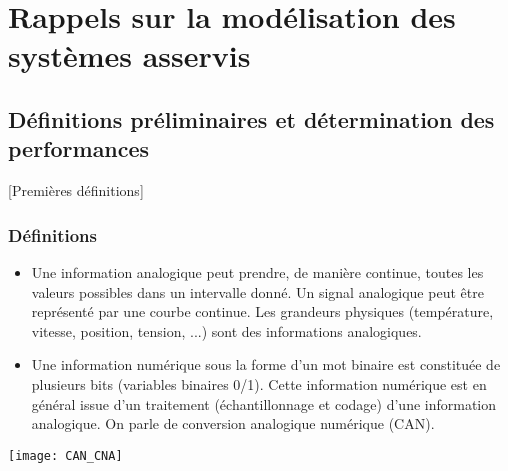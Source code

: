 \setchapterpreamble[u]{\margintoc}

\chapter{Rappels sur la modélisation des systèmes asservis}



\section{Définitions préliminaires et détermination des performances}[Premières définitions]

\subsection{Définitions}


\begin{defi} 

\begin{itemize}%
\item Une information analogique peut prendre, de manière continue, toutes les valeurs
possibles dans un intervalle donné. Un signal analogique peut être représenté
par une courbe continue. Les grandeurs physiques (température, vitesse,
position, tension, ...) sont des informations analogiques.

\item Une information numérique sous la forme d'un mot binaire est constituée de
plusieurs bits (variables binaires 0/1). Cette information numérique est en
général issue d'un traitement (échantillonnage et codage) d'une information
analogique. On parle de conversion analogique numérique (CAN).
\end{itemize}
\end{defi}

\begin{center}
\texttt{[image: CAN\_CNA]}
\end{center}

